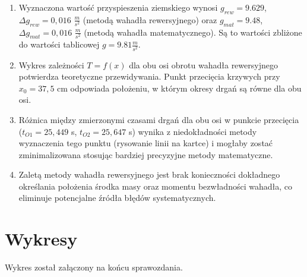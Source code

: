 \documentclass[a4paper,12pt]{article}
\begin{document}
\begin{enumerate}
  \item Wyznaczona wartość przyspieszenia ziemskiego wynosi $g_{rew} = 9.629$, $\Delta g_{rew} = 0,016$ $\frac{m}{s^2}$ (metodą wahadła rewersyjnego) oraz $g_{mat} = 9.48$, $\Delta g_{mat} = 0,016$ $\frac{m}{s^2}$ (metodą wahadła matematycznego). Są to wartości zbliżone do wartości tablicowej $g = 9.81 \frac{m}{s^2}$.

  \item Wykres zależności $T=f(x)$ dla obu osi obrotu wahadła rewersyjnego potwierdza teoretyczne przewidywania. Punkt przecięcia krzywych przy $x_0 = 37,5$ cm odpowiada położeniu, w którym okresy drgań są równe dla obu osi.

  \item Różnica między zmierzonymi czasami drgań dla obu osi w punkcie przecięcia ($t_{O1} = 25,449$ s, $t_{O2} = 25,647$ s) wynika z niedokładności metody wyznaczenia tego punktu (rysowanie linii na kartce) i mogłaby zostać zminimalizowana stosując bardziej precyzyjne metody matematyczne.

  \item Zaletą metody wahadła rewersyjnego jest brak konieczności dokładnego określania położenia środka masy oraz momentu bezwładności wahadła, co eliminuje potencjalne źródła błędów systematycznych.
\end{enumerate}

\section{Wykresy}

Wykres został załączony na końcu sprawozdania.



\end{document}
